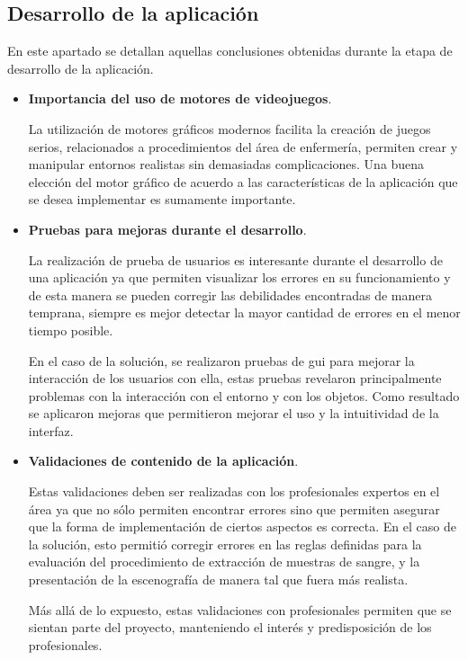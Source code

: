\subsection{Desarrollo de la aplicación}

En este apartado se detallan aquellas conclusiones obtenidas durante la 
etapa de desarrollo de la aplicación.

\begin{itemize}
\item \textbf{Importancia del uso de motores de videojuegos}.

La utilización de motores gráficos modernos facilita la creación de juegos
serios, relacionados a procedimientos del área de enfermería, permiten crear y
manipular entornos realistas sin demasiadas complicaciones. Una buena elección 
del motor gráfico de acuerdo a las características de la aplicación que se 
desea implementar es sumamente importante.

\item \textbf{Pruebas para mejoras durante el desarrollo}.

La realización de prueba de usuarios es interesante durante el desarrollo de 
una aplicación ya que permiten visualizar los errores en su funcionamiento y 
de esta manera se pueden corregir las debilidades encontradas de manera 
temprana, siempre es mejor detectar la mayor cantidad de errores en el menor 
tiempo posible.

En el caso de la solución, se realizaron pruebas de \Gls{gui} para mejorar la
interacción de los usuarios con ella, estas pruebas revelaron principalmente
problemas con la interacción con el entorno y con los objetos. Como resultado 
se aplicaron mejoras que permitieron mejorar el uso y la intuitividad de la
interfaz.

\item \textbf{Validaciones de contenido de la aplicación}.

Estas validaciones deben ser realizadas con los profesionales expertos en el 
área ya que no sólo permiten encontrar errores sino que permiten asegurar que 
la forma de implementación de ciertos aspectos es correcta. En el caso de la
solución, esto permitió corregir errores en las reglas definidas para la
evaluación del procedimiento de extracción de muestras de sangre, y la
presentación de la escenografía de manera tal que fuera más realista.

Más allá de lo expuesto, estas validaciones con profesionales permiten que se
sientan parte del proyecto, manteniendo el interés y predisposición de los
profesionales.

\end{itemize}


